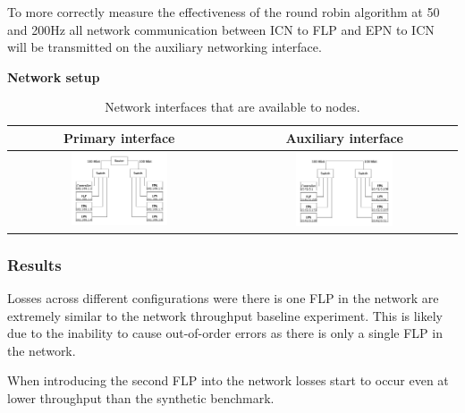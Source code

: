 \documentclass[]{article}
\begin{document}
To more correctly measure the effectiveness of the round robin algorithm at 50 and 200Hz all network communication between ICN to FLP and EPN to ICN will be transmitted on the auxiliary networking interface.

\begin{table}[H]
	\textbf{Network setup}
	\begin{center}
		\begin{tabular}{ | c | c | }
			\hline
			\textbf{Primary interface} & \textbf{Auxiliary interface} \\ \hline
			
			\includegraphics[width=0.45\textwidth]{images/network-primary-interface} & \includegraphics[width=0.45\textwidth]{images/network-auxiliary-interface} \\ \hline
		\end{tabular}
		\caption{Network interfaces that are available to nodes.}
		\label{tab:networkround}
	\end{center}
\end{table}

\subsubsection{Results}
Losses across different configurations were there is one FLP in the network are extremely similar to the network throughput baseline experiment. This is likely due to the inability to cause out-of-order errors as there is only a single FLP in the network.

When introducing the second FLP into the network losses start to occur even at lower throughput than the synthetic benchmark.
\end{document}
